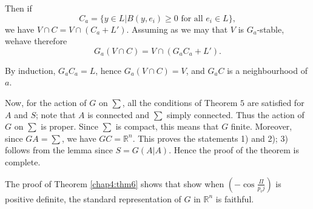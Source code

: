    Then if
   $$
   C_a = \bigg\{y \in L | B(y, e_i) \ge 0 \text{ for all } e_i \in
   L \bigg\}, 
   $$ 
   we have $V \cap C= V \cap(C_a+L')$. Assuming as we may that $V$ is
   $G_a$-stable, we\pageoriginale have therefore 
   $$
   G_a(V \cap C) = V \cap (G_a  C_a +L').
   $$
   
By induction, $G_a C_a=L$, hence $G_a(V \cap C)=V$, and $G_a C$ is a
neighbourhood of $a$. 
   
Now, for the action of $G$ on $\sum$, all the conditions of Theorem
   $5$  are satisfied for $A$ and $S$; note that $A$ is connected and
   $\sum$ simply connected. Thus the action  of $G$ on $\sum$ is
   proper. Since $\sum$ is compact, this means that $G$
   finite. Moreover, since $GA= \sum$, we have  $GC=
   \mathbb{R}^n$. This proves the statements 1) and 2); 3) follows
   from the lemma since $S= G(A|A)$. Hence the proof of the theorem is
   complete. 

\begin{remark*}
  The proof of Theorem \ref{chap4:thm6} shows that show when $\left(-\cos
  \frac{\Pi}{p_ij}\right)$ is positive definite, the standard
  representation of $G$ in $\mathbb{R}^n$ is faithful. 
\end{remark*}   
